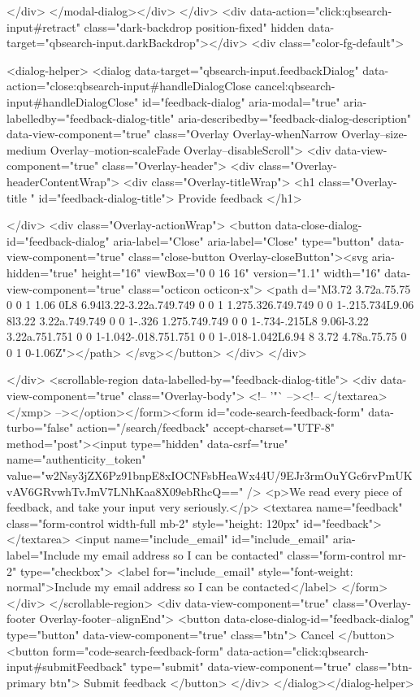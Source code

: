     </div>
</modal-dialog></div>
  </div>
  <div data-action="click:qbsearch-input#retract" class="dark-backdrop position-fixed" hidden data-target="qbsearch-input.darkBackdrop"></div>
  <div class="color-fg-default">
    
<dialog-helper>
  <dialog data-target="qbsearch-input.feedbackDialog" data-action="close:qbsearch-input#handleDialogClose cancel:qbsearch-input#handleDialogClose" id="feedback-dialog" aria-modal="true" aria-labelledby="feedback-dialog-title" aria-describedby="feedback-dialog-description" data-view-component="true" class="Overlay Overlay-whenNarrow Overlay--size-medium Overlay--motion-scaleFade Overlay--disableScroll">
    <div data-view-component="true" class="Overlay-header">
  <div class="Overlay-headerContentWrap">
    <div class="Overlay-titleWrap">
      <h1 class="Overlay-title " id="feedback-dialog-title">
        Provide feedback
      </h1>
        
    </div>
    <div class="Overlay-actionWrap">
      <button data-close-dialog-id="feedback-dialog" aria-label="Close" aria-label="Close" type="button" data-view-component="true" class="close-button Overlay-closeButton"><svg aria-hidden="true" height="16" viewBox="0 0 16 16" version="1.1" width="16" data-view-component="true" class="octicon octicon-x">
    <path d="M3.72 3.72a.75.75 0 0 1 1.06 0L8 6.94l3.22-3.22a.749.749 0 0 1 1.275.326.749.749 0 0 1-.215.734L9.06 8l3.22 3.22a.749.749 0 0 1-.326 1.275.749.749 0 0 1-.734-.215L8 9.06l-3.22 3.22a.751.751 0 0 1-1.042-.018.751.751 0 0 1-.018-1.042L6.94 8 3.72 4.78a.75.75 0 0 1 0-1.06Z"></path>
</svg></button>
    </div>
  </div>
  
</div>
      <scrollable-region data-labelled-by="feedback-dialog-title">
        <div data-view-component="true" class="Overlay-body">        <!-- '"` --><!-- </textarea></xmp> --></option></form><form id="code-search-feedback-form" data-turbo="false" action="/search/feedback" accept-charset="UTF-8" method="post"><input type="hidden" data-csrf="true" name="authenticity_token" value="w2Nsy3jZX6Pz91bnpE8xIOCNFsbHeaWx44U/9EJr3rmOuYGc6rvPmUKvAV6GRvwhTvJmV7LNhKaa8X09ebRhcQ==" />
          <p>We read every piece of feedback, and take your input very seriously.</p>
          <textarea name="feedback" class="form-control width-full mb-2" style="height: 120px" id="feedback"></textarea>
          <input name="include_email" id="include_email" aria-label="Include my email address so I can be contacted" class="form-control mr-2" type="checkbox">
          <label for="include_email" style="font-weight: normal">Include my email address so I can be contacted</label>
</form></div>
      </scrollable-region>
      <div data-view-component="true" class="Overlay-footer Overlay-footer--alignEnd">          <button data-close-dialog-id="feedback-dialog" type="button" data-view-component="true" class="btn">    Cancel
</button>
          <button form="code-search-feedback-form" data-action="click:qbsearch-input#submitFeedback" type="submit" data-view-component="true" class="btn-primary btn">    Submit feedback
</button>
</div>
</dialog></dialog-helper>

